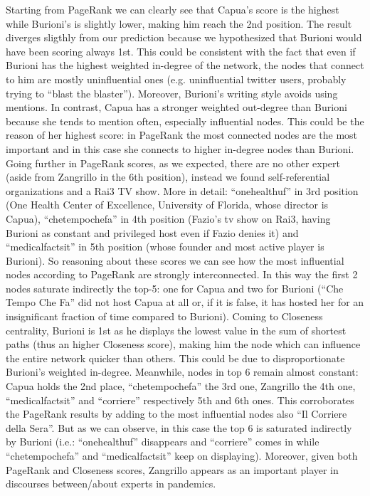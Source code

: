 \documentclass[sigchi]{acmart}
\begin{document}
Starting from PageRank we can clearly see that Capua’s score is the highest while Burioni’s is slightly lower, making him reach the 2nd position. The result diverges sligthly from our prediction because we hypothesized that Burioni would have been scoring always 1st. This could be consistent with the fact that even if Burioni has the highest weighted in-degree of the network, the nodes that connect to him are mostly uninfluential ones (e.g. uninfluential twitter users, probably trying to “blast the blaster”). Moreover, Burioni’s writing style avoids using mentions. In contrast, Capua has a stronger weighted out-degree than Burioni because she tends to mention often, especially influential nodes. This could be the reason of her highest score: in PageRank the most connected nodes are the most important and in this case she connects to higher in-degree nodes than Burioni. Going further in PageRank scores, as we expected, there are no other expert (aside from Zangrillo in the 6th position), instead we found self-referential organizations and a Rai3 TV show. More in detail: “onehealthuf” in 3rd position (One Health Center of Excellence, University of Florida, whose director is Capua),  “chetempochefa” in 4th position (Fazio’s tv show on Rai3, having Burioni as constant and privileged host even if Fazio denies it) and “medicalfactsit” in 5th position (whose founder and most active player is Burioni).  So reasoning about these scores we can see how  the most influential nodes according to PageRank are strongly interconnected. In this way the first 2 nodes saturate indirectly the top-5: one for Capua and two for Burioni (“Che Tempo Che Fa” did not host Capua at all or, if it is false, it has hosted her for an insignificant fraction of time compared to Burioni).
Coming to Closeness centrality, Burioni is 1st as he displays the lowest  value in the sum of shortest paths (thus an higher Closeness score), making him the node which can influence the entire network  quicker than others. This could be due to disproportionate Burioni’s weighted in-degree. Meanwhile, nodes in top 6 remain almost constant: Capua holds the 2nd place, “chetempochefa”  the 3rd one, Zangrillo the 4th one, “medicalfactsit” and “corriere” respectively 5th and 6th ones. This corroborates the PageRank results by adding to the most influential nodes also “Il Corriere della Sera”. But as we can observe, in this case the top 6 is saturated indirectly by Burioni (i.e.: “onehealthuf” disappears and “corriere” comes in while “chetempochefa” and “medicalfactsit” keep on displaying). Moreover, given both PageRank and Closeness scores, Zangrillo appears as an important player in discourses between/about experts in pandemics.
\end{document}
